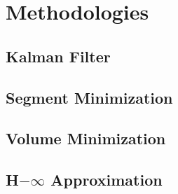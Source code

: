 \chapter{Methodologies} \label{ch:methodologies}
\section{Kalman Filter}
\section{Segment Minimization}
\section{Volume Minimization}
\section{H$-\infty$ Approximation}